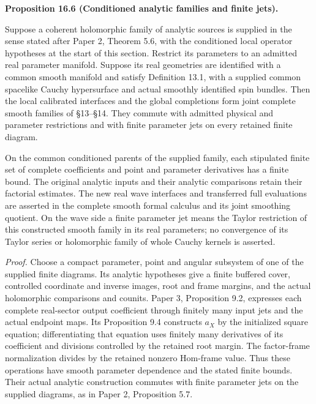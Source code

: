\documentclass[
  english,
  11pt,
  reqno]{amsart}
\makeatletter
\newcommand{\pandocstatementheading}[1]{%
  \par\addpenalty{\@beginparpenalty}%
  \addvspace{.5\baselineskip plus .2\baselineskip minus .2\baselineskip}%
  {\normalfont\bfseries #1\par}%
  \nobreak\@afterindenttrue\@afterheading
}
\makeatother
\begin{document}
\pandocstatementheading{\protect{}\label{prop:analytic-wave-conditioned-families}Proposition 16.6 (Conditioned analytic families and finite jets).}

Suppose a coherent holomorphic family of analytic sources is supplied in
the sense stated after Paper 2, Theorem 5.6, with the conditioned local
operator hypotheses at the start of this section. Restrict its
parameters to an admitted real parameter manifold. Suppose its real
geometries are identified with a common smooth manifold and satisfy
Definition 13.1, with a supplied common spacelike Cauchy hypersurface
and actual smoothly identified spin bundles. Then the local calibrated
interfaces and the global completions form joint complete smooth
families of §13--§14. They commute with admitted physical and parameter
restrictions and with finite parameter jets on every retained finite
diagram.

On the common conditioned parents of the supplied family, each
stipulated finite set of complete coefficients and point and parameter
derivatives has a finite bound. The original analytic inputs and their
analytic comparisons retain their factorial estimates. The new real wave
interfaces and transferred full evaluations are asserted in the complete
smooth formal calculus and its joint smoothing quotient. On the wave
side a finite parameter jet means the Taylor restriction of this
constructed smooth family in its real parameters; no convergence of its
Taylor series or holomorphic family of whole Cauchy kernels is asserted.

\emph{Proof.} Choose a compact parameter, point and angular subsystem of
one of the supplied finite diagrams. Its analytic hypotheses give a
finite buffered cover, controlled coordinate and inverse images, root
and frame margins, and the actual holomorphic comparisons and counits.
Paper 3, Proposition 9.2, expresses each complete real-sector output
coefficient through finitely many input jets and the actual endpoint
maps. Its Proposition 9.4 constructs \(a_X\) by the initialized square
equation; differentiating that equation uses finitely many derivatives
of its coefficient and divisions controlled by the retained root margin.
The factor-frame normalization divides by the retained nonzero Hom-frame
value. Thus these operations have smooth parameter dependence and the
stated finite bounds. Their actual analytic construction commutes with
finite parameter jets on the supplied diagrams, as in Paper 2,
Proposition 5.7.
\end{document}
